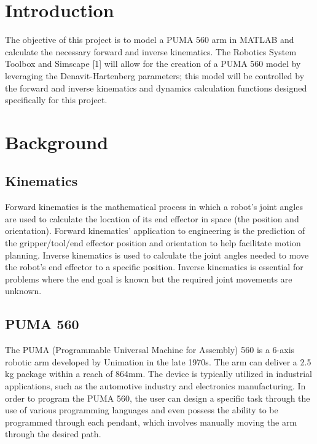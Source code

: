 \documentclass[conference]{IEEEtran}
\begin{document}
\section{Introduction}
The objective of this project is to model a PUMA 560 arm in MATLAB and calculate the necessary forward and inverse kinematics. The Robotics System Toolbox and Simscape [1] will allow for the creation of a PUMA 560 model by leveraging the Denavit-Hartenberg parameters; this model will be controlled by the forward and inverse kinematics and dynamics calculation functions designed specifically for this project.
\section{Background}
\subsection{Kinematics}
Forward kinematics is the mathematical process in which a robot's joint angles are used to calculate the location of its end effector in space (the position and orientation). Forward kinematics' application to engineering is the prediction of the gripper/tool/end effector position and orientation to help facilitate motion planning. Inverse kinematics is used to calculate the joint angles needed to move the robot’s end effector to a specific position. Inverse kinematics is essential for problems where the end goal is known but the required joint movements are unknown.
\subsection{PUMA 560}
The PUMA (Programmable Universal Machine for Assembly) 560 is a 6-axis robotic arm developed by Unimation in the late 1970s. The arm can deliver a 2.5 kg package within a reach of 864mm. The device is typically utilized in industrial applications, such as the automotive industry and electronics manufacturing. In order to program the PUMA 560, the user can design a specific task through the use of various programming languages and even possess the ability to be programmed through each pendant, which involves manually moving the arm through the desired path.
\end{document}
